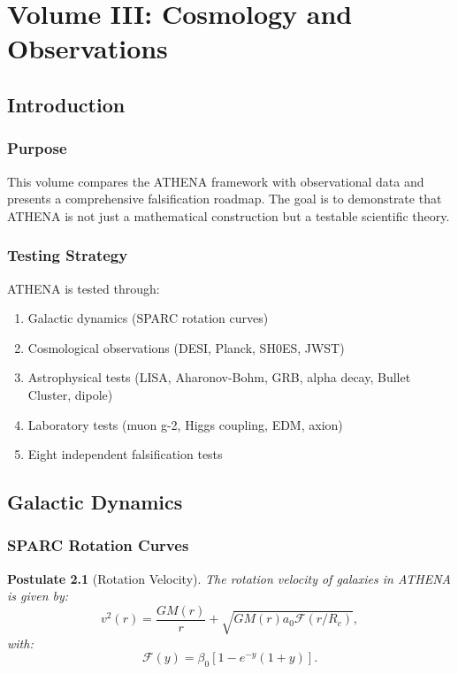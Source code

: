 \documentclass[12pt,oneside]{book}
\newtheorem{postulate}{Postulate}[chapter]
\begin{document}
\tableofcontents

\mainmatter

\part{Volume III: Cosmology and Observations}

\chapter{Introduction}

\section{Purpose}

This volume compares the ATHENA framework with observational data and presents a comprehensive falsification roadmap. The goal is to demonstrate that ATHENA is not just a mathematical construction but a testable scientific theory.

\section{Testing Strategy}

ATHENA is tested through:
\begin{enumerate}
    \item Galactic dynamics (SPARC rotation curves)
    \item Cosmological observations (DESI, Planck, SH0ES, JWST)
    \item Astrophysical tests (LISA, Aharonov-Bohm, GRB, alpha decay, Bullet Cluster, dipole)
    \item Laboratory tests (muon g-2, Higgs coupling, EDM, axion)
    \item Eight independent falsification tests
\end{enumerate}

\chapter{Galactic Dynamics}

\section{SPARC Rotation Curves}

\begin{postulate}[Rotation Velocity]
The rotation velocity of galaxies in ATHENA is given by:
\[
v^2(r) = \frac{GM(r)}{r} + \sqrt{GM(r) a_0 \mathcal{F}(r/R_c)},
\]
with:
\[
\mathcal{F}(y) = \beta_0 \left[1 - e^{-y}(1 + y)\right].
\]
\end{postulate}
\end{document}

